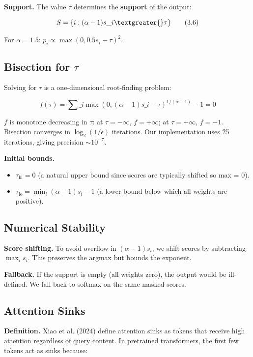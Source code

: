 \textbf{Support.} The value $\tau$ determines the \textbf{support} of the output:

\[
S = \{i : (\alpha - 1) s\_i \textgreater{} \tau\}
\tag{3.6}
\]

For $\alpha = 1.5$: $p_i \propto \max(0, 0.5 s_i - \tau)^2$.

\subsection{Bisection for $\tau$}

Solving for $\tau$ is a one-dimensional root-finding problem:

\[
f(\tau) = \sum\_i \max(0, (\alpha - 1) s\_i - \tau)^{1/(\alpha - 1)} - 1 = 0
\tag{3.7}
\]

$f$ is monotone decreasing in $\tau$: at $\tau = -\infty$, $f = +\infty$; 
at $\tau = +\infty$, $f = -1$. Bisection converges in $\log_2(1/\epsilon)$ 
iterations. Our implementation uses 25 iterations, giving precision 
$\sim 10^{-7}$.

\textbf{Initial bounds.}

\begin{itemize}
\item $\tau_\text{hi} = 0$ (a natural upper bound since scores are typically
  shifted so max = 0).
\item $\tau_\text{lo} = \min_i (\alpha - 1) s_i - 1$ (a lower bound below which
  all weights are positive).

\end{itemize}
\subsection{Numerical Stability}

\textbf{Score shifting.} To avoid overflow in $(\alpha - 1) s_i$, we shift scores 
by subtracting $\max_i s_i$. This preserves the argmax but bounds the 
exponent.

\textbf{Fallback.} If the support is empty (all weights zero), the output would be 
ill-defined. We fall back to softmax on the same masked scores.

\subsection{Attention Sinks}

\textbf{Definition.} Xiao et al. (2024) define attention sinks as tokens that 
receive high attention regardless of query content. In pretrained transformers, 
the first few tokens act as sinks because:

